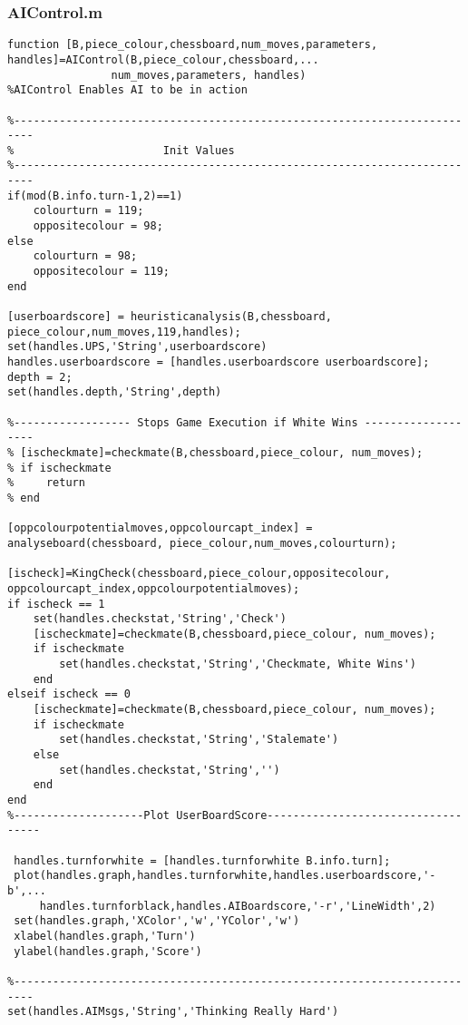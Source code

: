 \documentclass{article}
\begin{document}
\subsubsection{AIControl.m}
\begin{lstlisting}
function [B,piece_colour,chessboard,num_moves,parameters, handles]=AIControl(B,piece_colour,chessboard,...
                num_moves,parameters, handles)
%AIControl Enables AI to be in action

%-------------------------------------------------------------------------
%                       Init Values
%-------------------------------------------------------------------------
if(mod(B.info.turn-1,2)==1)
    colourturn = 119;
    oppositecolour = 98;
else
    colourturn = 98;
    oppositecolour = 119;
end

[userboardscore] = heuristicanalysis(B,chessboard, piece_colour,num_moves,119,handles);
set(handles.UPS,'String',userboardscore)
handles.userboardscore = [handles.userboardscore userboardscore];
depth = 2;
set(handles.depth,'String',depth)

%------------------ Stops Game Execution if White Wins -------------------
% [ischeckmate]=checkmate(B,chessboard,piece_colour, num_moves);
% if ischeckmate
%     return
% end

[oppcolourpotentialmoves,oppcolourcapt_index] = analyseboard(chessboard, piece_colour,num_moves,colourturn);

[ischeck]=KingCheck(chessboard,piece_colour,oppositecolour, oppcolourcapt_index,oppcolourpotentialmoves);
if ischeck == 1
    set(handles.checkstat,'String','Check')
    [ischeckmate]=checkmate(B,chessboard,piece_colour, num_moves);
    if ischeckmate
        set(handles.checkstat,'String','Checkmate, White Wins')
    end
elseif ischeck == 0
    [ischeckmate]=checkmate(B,chessboard,piece_colour, num_moves);
    if ischeckmate
        set(handles.checkstat,'String','Stalemate')
    else
        set(handles.checkstat,'String','')
    end
end
%--------------------Plot UserBoardScore-----------------------------------

 handles.turnforwhite = [handles.turnforwhite B.info.turn];
 plot(handles.graph,handles.turnforwhite,handles.userboardscore,'-b',...
     handles.turnforblack,handles.AIBoardscore,'-r','LineWidth',2)
 set(handles.graph,'XColor','w','YColor','w')
 xlabel(handles.graph,'Turn')
 ylabel(handles.graph,'Score')

%-------------------------------------------------------------------------
set(handles.AIMsgs,'String','Thinking Really Hard')


\end{lstlisting}
\end{document}
